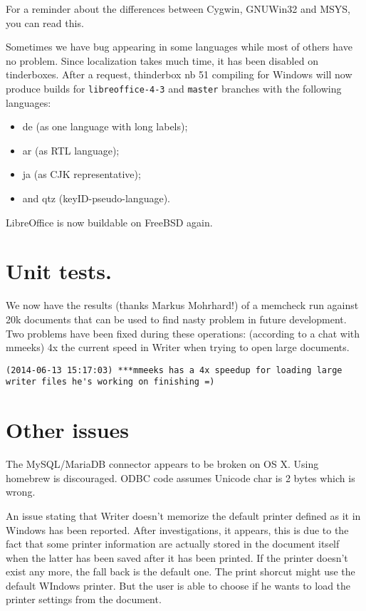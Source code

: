 \documentclass{article}
\begin{document}
For a reminder about the differences between Cygwin, GNUWin32 and MSYS, you can read this\cite{winBuildCygwinMsysGnuWin32Comparison}.

Sometimes we have bug appearing in some languages while most of others have no problem. Since localization takes much time, it has been disabled on tinderboxes. After a request, thinderbox nb 51 compiling for Windows will now produce builds for \lstinline{libreoffice-4-3} and \lstinline{master} branches with the following languages:
\begin{itemize}
    \item de (as one language with long labels);
    \item ar (as RTL language);
    \item ja (as CJK representative);
    \item and qtz (keyID-pseudo-language).
\end{itemize}

LibreOffice is now buildable on FreeBSD again\cite{freeBsdBuild1}\cite{freeBsdBuild2}.

\section{Unit tests.}

We now have the results (thanks Markus Mohrhard!) of a memcheck run against 20k documents that can
be used to find nasty problem in future development\cite{memcheckTests}. Two problems
have been fixed during these operations: (according to a chat with
mmeeks) 4x the current speed in Writer when trying to open large documents.

\begin{lstlisting}
(2014-06-13 15:17:03) ***mmeeks has a 4x speedup for loading large writer files he's working on finishing =)
\end{lstlisting}

\section{Other issues}

The MySQL/MariaDB connector appears to be broken on OS X. Using homebrew
is discouraged. ODBC code assumes Unicode char is 2 bytes which is wrong\cite{sqlConnectorOsx1}\cite{sqlConnectorOsx2}.

An issue stating that Writer doesn't memorize the default printer
defined as it in Windows has been reported. After investigations, it
appears, this is due to the fact that some printer information are
actually stored in the document itself when the latter has been saved
after it has been printed. If the printer doesn't exist any more, the
fall back is the default one\cite{writerPrinter1}. The print shorcut might use the
default WIndows printer\cite{writerPrinter2}. But the user is able to choose if he wants
to load the printer settings from the document\cite{writerPrinter3}.
\end{document}
